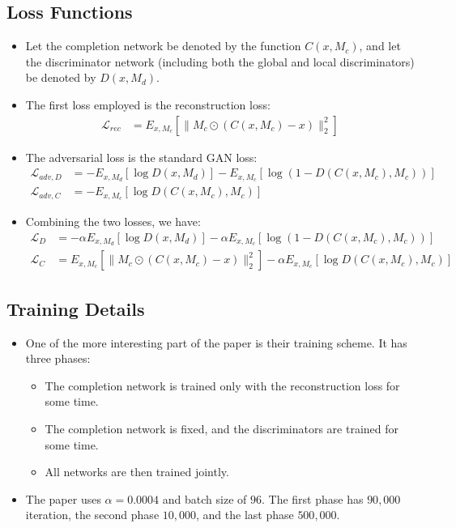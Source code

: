 \documentclass[10pt]{article}
\begin{document}
  \subsection{Loss Functions}  

  \begin{itemize}
  	\item Let the completion network be denoted by the function $C(x, M_c)$, and let the discriminator network (including both the global and local discriminators) be denoted by $D(x, M_d)$.

  	\item The first loss employed is the reconstruction loss:
  	\begin{align*}
  		\mathcal{L}_{rec} &= E_{x,M_c} [\| M_c \odot (C(x,M_c) - x) \|_2^2]
  	\end{align*}

  	\item The adversarial loss is the standard GAN loss:
  	\begin{align*}
  		\mathcal{L}_{adv,D} &= - E_{x, M_d} [\log D(x, M_d)] - E_{x,M_c} [\log (1 - D(C(x,M_c), M_c))] \\
  		\mathcal{L}_{adv,C} &= - E_{x,M_c} [\log D(C(x,M_c), M_c)]
  	\end{align*}

  	\item Combining the two losses, we have:
  	\begin{align*}
  		\mathcal{L}_D &= - \alpha E_{x, M_d} [\log D(x, M_d)] - \alpha E_{x,M_c} [\log (1 - D(C(x,M_c), M_c))] \\
  		\mathcal{L}_C &= E_{x,M_c} [\| M_c \odot (C(x,M_c) - x) \|_2^2] - \alpha E_{x,M_c} [\log D(C(x,M_c), M_c)]
  	\end{align*}
  \end{itemize} 

  \subsection{Training Details}  

  \begin{itemize}
  	\item One of the more interesting part of the paper is their training scheme. It has three phases:
  	\begin{itemize}
  		\item The completion network is trained only with the reconstruction loss for some time.
  		\item The completion network is fixed, and the discriminators are trained for some time.
  		\item All networks are then trained jointly.
  	\end{itemize}

  	\item The paper uses $\alpha = 0.0004$ and batch size of $96$. The first phase has $90,000$ iteration, the second phase $10,000$, and the last phase $500,000$.  	
  \end{itemize}
\end{document}
